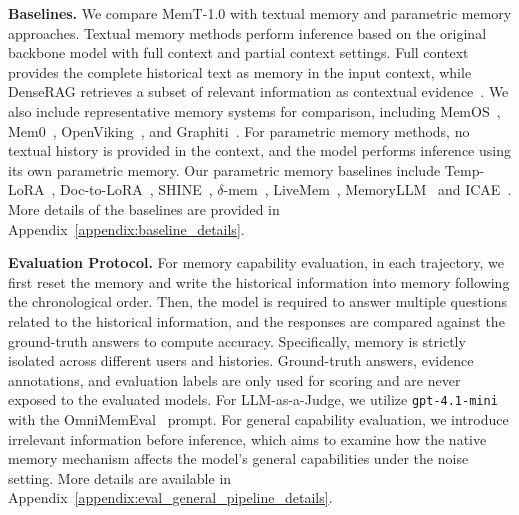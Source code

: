 \textbf{Baselines.}
We compare MemT-1.0 with textual memory and parametric memory approaches.
Textual memory methods perform inference based on the original backbone model with full context and partial context settings.
Full context provides the complete historical text as memory in the input context, while DenseRAG retrieves a subset of relevant information as contextual evidence~\cite{karpukhin2020densepassageretrievalopendomain}.
We also include representative memory systems for comparison, including MemOS~\cite{li2025memos}, Mem0~\cite{chhikara2025mem0}, OpenViking~\cite{fu2026vikingmem}, and Graphiti~\cite{rasmussen2025zep}.
For parametric memory methods, no textual history is provided in the context, and the model performs inference using its own parametric memory.
Our parametric memory baselines include Temp-LoRA~\cite{wang2024greater}, Doc-to-LoRA~\cite{charakorn2026doc}, SHINE~\cite{liu2026shine}, $\delta$-mem~\cite{lei2026delta}, LiveMem~\cite{liu2026livemem}, MemoryLLM~\cite{wang2024memoryllm} and ICAE~\cite{ge2023context}.
More details of the baselines are provided in Appendix~\ref{appendix:baseline_details}.

\textbf{Evaluation Protocol.}
For memory capability evaluation, in each trajectory, we first reset the memory and write the historical information into memory following the chronological order.
Then, the model is required to answer multiple questions related to the historical information, and the responses are compared against the ground-truth answers to compute accuracy.
Specifically, memory is strictly isolated across different users and histories. 
Ground-truth answers, evidence annotations, and evaluation labels are only used for scoring and are never exposed to the evaluated models.
For LLM-as-a-Judge, we utilize \texttt{gpt-4.1-mini} with the OmniMemEval~\cite{memtensor2026omnimemeval} prompt.
For general capability evaluation, we introduce irrelevant information before inference, which aims to examine how the native memory mechanism affects the model’s general capabilities under the noise setting.
More details are available in Appendix~\ref{appendix:eval_general_pipeline_details}.



